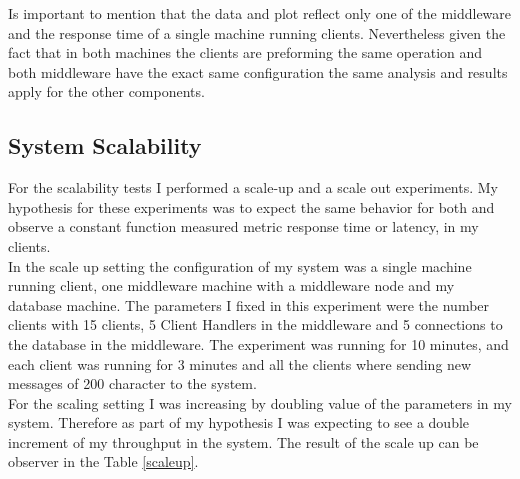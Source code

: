 Is important to mention that the data and plot reflect only one of the middleware and the response time of a single machine running clients. Nevertheless given the fact that in both machines the clients are preforming the same operation and both middleware have the exact same configuration the same analysis and results apply for the other components.

\subsection{System Scalability}\label{sec:system-scalability}

For the scalability tests I performed a scale-up and a scale out experiments. My hypothesis for these experiments was to expect the same behavior for both and observe a constant function measured metric response time or latency, in my clients.\\

In the scale up setting the configuration of my system was a single machine running client, one middleware machine with a middleware node and my database machine. The parameters I fixed in this experiment were the number clients with 15 clients, 5 Client Handlers in the middleware and 5 connections to the database in the middleware. The experiment was running for 10 minutes, and each client was running for 3 minutes and all the clients where sending new messages of 200 character to the system.\\

For the scaling setting I was increasing by doubling value of the parameters in my system. Therefore as part of my hypothesis I was expecting to see a double increment of my throughput in the system. The result of the scale up can be observer in the Table \ref{scaleup}.\\

